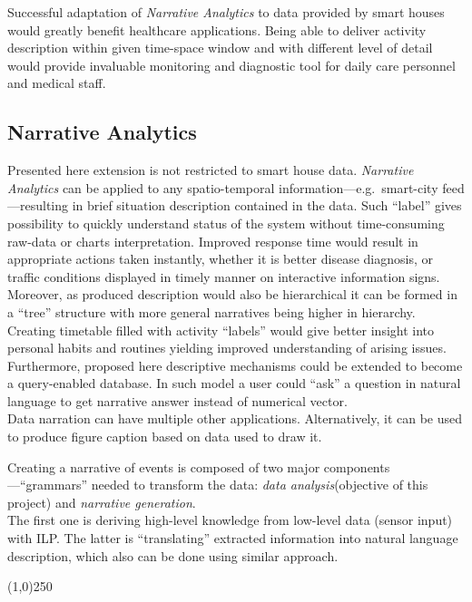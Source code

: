 \documentclass[12pt, a4paper, pdflatex, leqno, twoside, openright]{report}
\begin{document}
Successful adaptation of \emph{Narrative Analytics} to data provided by smart houses would greatly benefit healthcare applications. Being able to deliver activity description within given time-space window and with different level of detail would provide invaluable monitoring and diagnostic tool for daily care personnel and medical staff.

    \subsection{Narrative Analytics}
Presented here extension is not restricted to smart house data. \emph{Narrative Analytics} can be applied to any spatio-temporal information---e.g.\ smart-city feed---resulting in brief situation description contained in the data. Such ``label'' gives possibility to quickly understand status of the system without time-consuming raw-data or charts interpretation. Improved response time would result in appropriate actions taken instantly, whether it is better disease diagnosis, or traffic conditions displayed in timely manner on interactive information signs.\\
Moreover, as produced description would also be hierarchical it can be formed in a ``tree'' structure with more general narratives being higher in hierarchy. Creating timetable filled with activity ``labels'' would give better insight into personal habits and routines yielding improved understanding of arising issues.\\
Furthermore, proposed here descriptive mechanisms could be extended to become a query-enabled database. In such model a user could ``ask'' a question in natural language to get narrative answer instead of numerical vector.\\

Data narration can have multiple other applications. Alternatively, it can be used to produce figure caption based on data used to draw it.

Creating a narrative of events is composed of two major components---``grammars'' needed to transform the data: \emph{data analysis}(objective of this project) and \emph{narrative generation}.\\
The first one is deriving high-level knowledge from low-level data (sensor input) with ILP. The latter is ``translating'' extracted information into natural language description, which also can be done using similar approach.


\begin{center}
\noindent \line(1,0){250}
\end{center}

{}

% 
\end{document}
